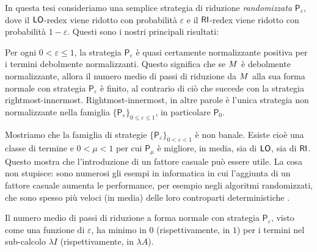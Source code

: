 In questa tesi consideriamo una semplice strategia di riduzione \emph{randomizzata}
$\mathsf{P}_\varepsilon$, dove il $\textsf{LO}$-redex
viene ridotto con probabilità $\varepsilon$ e il $\textsf{RI}$-redex viene
ridotto con probabilità $1-\varepsilon$. Questi sono i nostri principali risultati:
\begin{varitemize}
	\item
	Per ogni $0<\varepsilon\leq 1$, la strategia
	$\mathsf{P}_\varepsilon$ è quasi certamente normalizzante positiva per i
	termini debolmente normalizzanti. Questo significa che se $M$ è
	debolmente normalizzante, allora il numero medio di passi di riduzione da
	$M$ alla sua forma normale con strategia $\mathsf{P}_\varepsilon$
	è finito, al contrario di ciò che succede con la strategia rightmost-innermost.
	Rightmost-innermost, in altre parole è l'unica strategia non normalizzante nella famiglia
	$\{\mathsf{P}_\varepsilon\}_{0\leq\varepsilon\leq 1}$, in particolare $\mathsf{P}_0$.
	\item
	Mostriamo che la famiglia di strategie
	$\{\mathsf{P}_\varepsilon\}_{0<\varepsilon<1}$ è non banale.
	Esiste cioè una classe di termine e
	$0<\mu<1$ per cui $\mathsf{P}_\mu$ è migliore, in media, sia di
	$\textsf{LO}$, sia di $\textsf{RI}$. Questo mostra che l'introduzione di un fattore casuale può essere
	utile. La cosa non stupisce:
	sono numerosi gli esempi in informatica in cui l'aggiunta di un fattore casuale aumenta
	le performance, per esempio negli algoritmi randomizzati, che sono spesso più veloci
	(in media) delle loro controparti deterministiche
	\cite{motwani_randomized_1995}.
	\item
	Il numero medio di passi di riduzione a forma normale con strategia
	$\mathsf{P}_\varepsilon$, visto come una funzione di
	$\varepsilon$, ha minimo in $0$ (rispettivamente, in $1$) per i termini nel sub-calcolo
	$\lambda I$ (rispettivamente, in $\lambda A$).
\end{varitemize}

\endgroup

